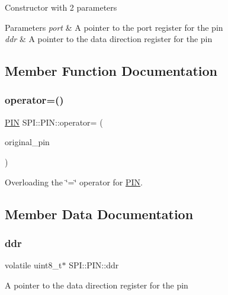 Constructor with 2 parameters 
\begin{DoxyParams}{Parameters}
{\em port} & A pointer to the port register for the pin \\
\hline
{\em ddr} & A pointer to the data direction register for the pin \\
\hline
\end{DoxyParams}


\subsection{Member Function Documentation}
\hypertarget{struct_s_p_i_1_1_p_i_n_adf85f2ca789d5de5ac6cf384242198a9}{}\label{struct_s_p_i_1_1_p_i_n_adf85f2ca789d5de5ac6cf384242198a9} 
\subsubsection{\texorpdfstring{operator=()}{operator=()}}
{\footnotesize\ttfamily \hyperlink{struct_s_p_i_1_1_p_i_n}{P\+IN} S\+P\+I\+::\+P\+I\+N\+::operator= (\begin{DoxyParamCaption}\item[{\hyperlink{struct_s_p_i_1_1_p_i_n}{P\+IN} $\ast$}]{original\+\_\+pin }\end{DoxyParamCaption})\hspace{0.3cm}{\ttfamily [inline]}}

Overloading the \char`\"{}=\char`\"{} operator for \hyperlink{struct_s_p_i_1_1_p_i_n}{P\+IN}. 

\subsection{Member Data Documentation}
\hypertarget{struct_s_p_i_1_1_p_i_n_aa58f0c2ecb79cd6e1f8a6fea9623ee1e}{}\label{struct_s_p_i_1_1_p_i_n_aa58f0c2ecb79cd6e1f8a6fea9623ee1e} 
\subsubsection{\texorpdfstring{ddr}{ddr}}
{\footnotesize\ttfamily volatile uint8\+\_\+t$\ast$ S\+P\+I\+::\+P\+I\+N\+::ddr}

A pointer to the data direction register for the pin \hypertarget{struct_s_p_i_1_1_p_i_n_a55bfa130253b589dc60b7a887c0fbfb4}{}\label{struct_s_p_i_1_1_p_i_n_a55bfa130253b589dc60b7a887c0fbfb4} 
